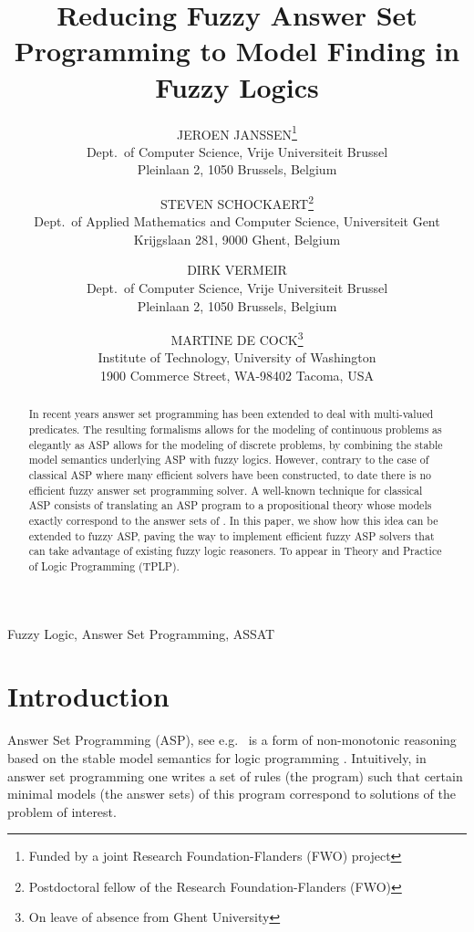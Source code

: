 \documentclass{tlp}
\title{Reducing Fuzzy Answer Set Programming to Model Finding in Fuzzy Logics}
\author[Jeroen Janssen, Steven Schockaert, Dirk Vermeir and Martine De Cock]{JEROEN JANSSEN\thanks{Funded by a joint Research Foundation-Flanders (FWO) project}\\Dept.~of Computer Science, Vrije Universiteit Brussel\\Pleinlaan 2, 1050 Brussels, Belgium\\
       \email{jeroen.janssen@vub.ac.be}
       \and STEVEN SCHOCKAERT\thanks{Postdoctoral fellow of the Research Foundation-Flanders (FWO)}\\Dept.~of Applied Mathematics and Computer Science, Universiteit Gent\\Krijgslaan 281, 9000 Ghent, Belgium\\
	\email{steven.schockaert@ugent.be}
       \and DIRK VERMEIR\\Dept.~of Computer Science, Vrije Universiteit Brussel\\Pleinlaan 2, 1050 Brussels, Belgium\\
	\email{dirk.vermeir@vub.ac.be}
       \and MARTINE DE COCK\thanks{On leave of absence from Ghent University}\\Institute of Technology, University of Washington\\1900 Commerce Street, WA-98402 Tacoma, USA\\
	\email{mdecock@u.washington.edu}}
\begin{document}
\maketitle

\begin{abstract}
 In recent years answer set programming has been extended to deal with multi-valued predicates. The resulting formalisms
allows for the modeling of continuous problems as elegantly as ASP allows for the modeling of discrete problems, by combining the
stable model semantics underlying ASP with fuzzy logics. However, contrary to the case of classical ASP where many
efficient solvers have been constructed, to date there is no efficient fuzzy answer set programming solver. A well-known
technique for classical ASP consists of translating an ASP program  to a propositional theory whose models exactly
correspond to the answer sets of . In this paper, we show how this idea can be extended to fuzzy ASP, paving the way
to implement efficient fuzzy ASP solvers that can take advantage of existing fuzzy logic reasoners. To appear
in Theory and Practice of Logic Programming (TPLP).
\end{abstract}

\begin{keywords}
 Fuzzy Logic, Answer Set Programming, ASSAT
\end{keywords}

\section{Introduction}

Answer Set Programming (ASP), see e.g.~\cite{BaralBook} is a form of non-monotonic reasoning based on the stable model semantics for logic programming \cite{gelfondl88}. Intuitively, in answer set programming one writes a set of rules (the program) such that certain minimal models (the answer sets) of this program correspond to solutions of the problem of interest.
\end{document}
